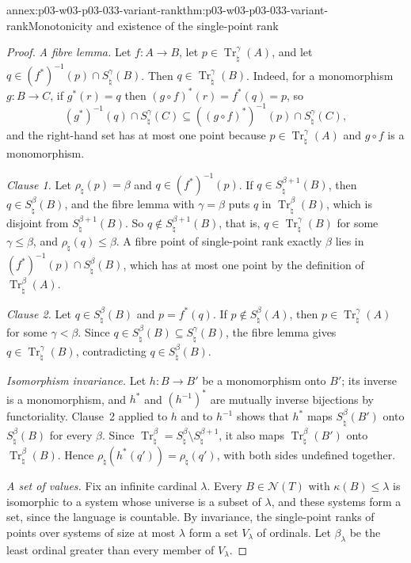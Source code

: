 \begin{annexitem}{annex:p03-w03-p03-033-variant-rank}{thm:p03-w03-p03-033-variant-rank}{Monotonicity and existence of the single-point rank}
\begin{proof}
\emph{A fibre lemma.} Let \(f:A\to B\), let
\(p\in\operatorname{Tr}_\natural^\gamma(A)\), and let
\(q\in(f^*)^{-1}(p)\cap S_\natural^\gamma(B)\). Then
\(q\in\operatorname{Tr}_\natural^\gamma(B)\). Indeed, for a monomorphism
\(g:B\to C\), if \(g^*(r)=q\) then \((g\circ f)^*(r)=f^*(q)=p\), so
\[
 (g^*)^{-1}(q)\cap S_\natural^\gamma(C)\subseteq
 ((g\circ f)^*)^{-1}(p)\cap S_\natural^\gamma(C),
\]
and the right-hand set has at most one point because
\(p\in\operatorname{Tr}_\natural^\gamma(A)\) and \(g\circ f\) is a
monomorphism.

\emph{Clause 1.} Let \(\rho_\natural(p)=\beta\) and
\(q\in(f^*)^{-1}(p)\). If \(q\in S_\natural^{\beta+1}(B)\), then
\(q\in S_\natural^\beta(B)\), and the fibre lemma with \(\gamma=\beta\)
puts \(q\) in \(\operatorname{Tr}_\natural^\beta(B)\), which is disjoint
from \(S_\natural^{\beta+1}(B)\). So \(q\notin S_\natural^{\beta+1}(B)\),
that is, \(q\in\operatorname{Tr}_\natural^\gamma(B)\) for some
\(\gamma\leq\beta\), and \(\rho_\natural(q)\leq\beta\). A fibre point of
single-point rank exactly \(\beta\) lies in
\((f^*)^{-1}(p)\cap S_\natural^\beta(B)\), which has at most one point by
the definition of \(\operatorname{Tr}_\natural^\beta(A)\).

\emph{Clause 2.} Let \(q\in S_\natural^\beta(B)\) and \(p=f^*(q)\).
If \(p\notin S_\natural^\beta(A)\), then
\(p\in\operatorname{Tr}_\natural^\gamma(A)\) for some \(\gamma<\beta\).
Since \(q\in S_\natural^\beta(B)\subseteq S_\natural^\gamma(B)\), the fibre
lemma gives \(q\in\operatorname{Tr}_\natural^\gamma(B)\), contradicting
\(q\in S_\natural^\beta(B)\).

\emph{Isomorphism invariance.} Let \(h:B\to B'\) be a monomorphism onto
\(B'\); its inverse is a monomorphism, and \(h^*\) and \((h^{-1})^*\) are
mutually inverse bijections by functoriality. Clause~2 applied to \(h\) and
to \(h^{-1}\) shows that \(h^*\) maps \(S_\natural^\beta(B')\) onto
\(S_\natural^\beta(B)\) for every \(\beta\). Since
\(\operatorname{Tr}_\natural^\beta=S_\natural^\beta\setminus
S_\natural^{\beta+1}\), it also maps \(\operatorname{Tr}_\natural^\beta(B')\)
onto \(\operatorname{Tr}_\natural^\beta(B)\). Hence
\(\rho_\natural(h^*(q'))=\rho_\natural(q')\), with both sides undefined
together.

\emph{A set of values.} Fix an infinite cardinal \(\lambda\). Every
\(B\in\mathcal N(T)\) with \(\kappa(B)\leq\lambda\) is isomorphic to a
system whose universe is a subset of \(\lambda\), and these systems form a
set, since the language is countable. By invariance, the single-point
ranks of points over systems of size at most \(\lambda\) form a set
\(V_\lambda\) of ordinals. Let \(\beta_\lambda\) be the least ordinal
greater than every member of \(V_\lambda\).


\end{proof}
\end{annexitem}
